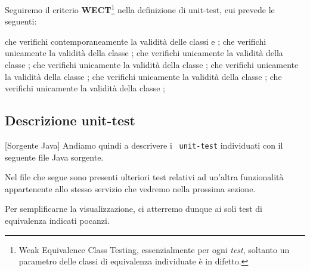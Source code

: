 Seguiremo il criterio \textbf{WECT}\footnote{Weak Equivalence Class Testing, 
essenzialmente per ogni \textit{test}, soltanto un parametro delle classi di equivalenza individuate è in difetto.} nella
definizione di unit-test, cui prevede le seguenti:
\begin{eqtest}
	 che verifichi contemporaneamente la validità delle classi  e ;
	 che verifichi unicamente la validità della classe ;
	 che verifichi unicamente la validità della classe ;
	 che verifichi unicamente la validità della classe ;
	 che verifichi unicamente la validità della classe ;
	 che verifichi unicamente la validità della classe ;
	 che verifichi unicamente la validità della classe ;
\end{eqtest}

\newpage
\subsection{Descrizione unit-test}[Sorgente Java]
Andiamo quindi a descrivere i \texttt{\color{ddchaptercolor!80!black}\theenumi\ unit-test} individuati
con il seguente file Java sorgente.

\begin{warn}[Semplificazione]
	Nel file che segue sono presenti ulteriori test relativi ad un'altra funzionalità appartenente allo stesso servizio
	che vedremo nella prossima sezione. 

	\par\vspace{3mm}
	Per semplificarne la visualizzazione, ci atterremo dunque ai soli test di equivalenza indicati pocanzi.
\end{warn}

